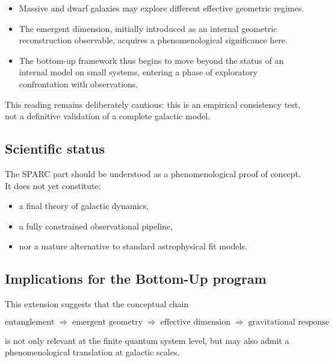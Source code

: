 \documentclass[11pt]{article}
\begin{document}
\begin{itemize}
\item Massive and dwarf galaxies may explore different effective
      geometric regimes.
\item The emergent dimension, initially introduced as an internal
      geometric reconstruction observable, acquires a phenomenological
      significance here.
\item The bottom-up framework thus begins to move beyond the status
      of an internal model on small systems, entering a phase of
      exploratory confrontation with observations.
\end{itemize}

This reading remains deliberately cautious: this is an empirical
consistency test, not a definitive validation of a complete galactic
model.

\subsection{Scientific status}

The SPARC part should be understood as a phenomenological proof of
concept. It does not yet constitute:

\begin{itemize}
\item a final theory of galactic dynamics,
\item a fully constrained observational pipeline,
\item nor a mature alternative to standard astrophysical fit models.
\end{itemize}

\subsection{Implications for the Bottom-Up program}

This extension suggests that the conceptual chain

\[
\text{entanglement}
\;\Longrightarrow\;
\text{emergent geometry}
\;\Longrightarrow\;
\text{effective dimension}
\;\Longrightarrow\;
\text{gravitational response}
\]

is not only relevant at the finite quantum system level, but may
also admit a phenomenological translation at galactic scales.

\end{document}
